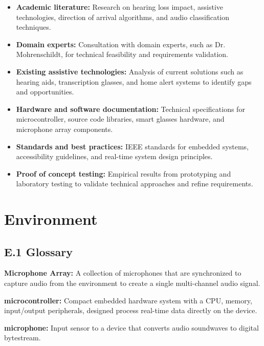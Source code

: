 \documentclass[12pt]{article}
\theoremstyle{definition}
\begin{document}
\begin{itemize}
\item \textbf{Academic literature:} Research on hearing loss impact,
assistive technologies, direction of arrival algorithms, and audio
classification techniques.

\item \textbf{Domain experts:}\label{itm:domain-experts} Consultation with domain experts, such as 
Dr. Mohrenschildt, for technical feasibility and requirements validation.

\item \textbf{Existing assistive technologies:} Analysis of current solutions
such as hearing aids, transcription glasses, and home alert systems to
identify gaps and opportunities.

\item \textbf{Hardware and software documentation:} Technical specifications
for microcontroller, source code libraries, smart glasses hardware,
and microphone array components.

\item \textbf{Standards and best practices:} IEEE standards for embedded
systems, accessibility guidelines, and real-time system design principles.

\item \textbf{Proof of concept testing:} Empirical results from prototyping
and laboratory testing to validate technical approaches and refine
requirements.
\end{itemize}


\section{Environment}

\subsection{E.1 Glossary}

\textbf{Microphone Array:}\label{def:microphone_array} A collection of 
microphones that are synchronized to capture audio from the 
environment to create a single multi-channel audio signal.


\textbf{microcontroller:}\label{def:microcontroller} Compact embedded hardware
system with a CPU, memory, input/output peripherals, designed process real-time
data directly on the device.

\textbf{microphone:}\label{def:microphone} Input sensor to a device that
converts audio soundwaves to digital bytestream.
\end{document}
